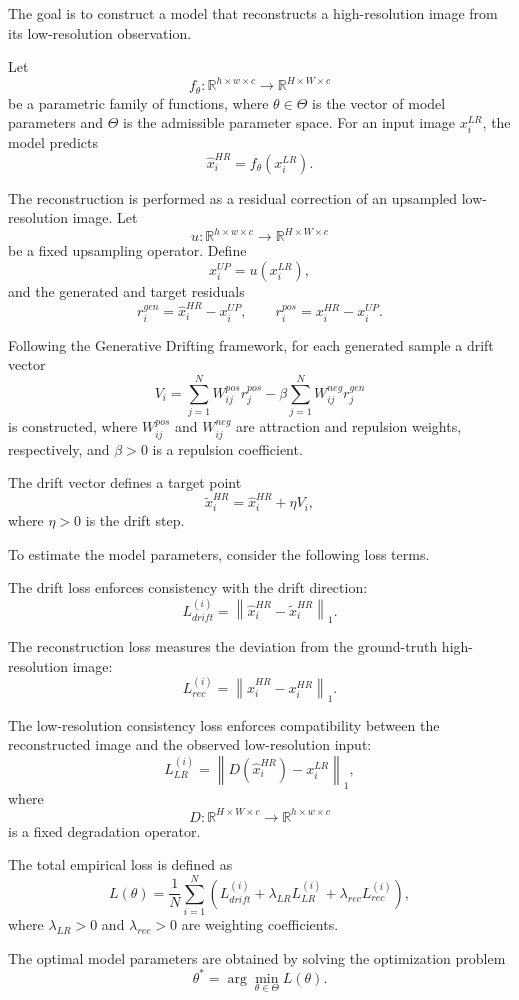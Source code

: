 \documentclass{article}
\begin{document}
The goal is to construct a model that reconstructs a high-resolution image
from its low-resolution observation.

Let
\[
f_{\theta}:\mathbb{R}^{h\times w\times c}\rightarrow\mathbb{R}^{H\times W\times c}
\]
be a parametric family of functions, where $\theta\in\Theta$ is the vector of
model parameters and $\Theta$ is the admissible parameter space.
For an input image $x_i^{LR}$, the model predicts
\[
\hat{x}_i^{HR}=f_{\theta}(x_i^{LR}).
\]

The reconstruction is performed as a residual correction of an upsampled
low-resolution image. Let
\[
u:\mathbb{R}^{h\times w\times c}\rightarrow\mathbb{R}^{H\times W\times c}
\]
be a fixed upsampling operator. Define
\[
x_i^{UP}=u(x_i^{LR}),
\]
and the generated and target residuals
\[
r_i^{gen}=\hat{x}_i^{HR}-x_i^{UP}, \qquad
r_i^{pos}=x_i^{HR}-x_i^{UP}.
\]

Following the Generative Drifting framework, for each generated sample
a drift vector
\[
V_i=
\sum_{j=1}^{N}W_{ij}^{pos}r_j^{pos}
-
\beta\sum_{j=1}^{N}W_{ij}^{neg}r_j^{gen}
\]
is constructed, where $W_{ij}^{pos}$ and $W_{ij}^{neg}$ are attraction and
repulsion weights, respectively, and $\beta>0$ is a repulsion coefficient.

The drift vector defines a target point
\[
\tilde{x}_i^{HR}=\hat{x}_i^{HR}+\eta V_i,
\]
where $\eta>0$ is the drift step.

To estimate the model parameters, consider the following loss terms.

The drift loss enforces consistency with the drift direction:
\[
L_{drift}^{(i)}=
\left\|
\hat{x}_i^{HR}-\tilde{x}_i^{HR}
\right\|_1.
\]

The reconstruction loss measures the deviation from the ground-truth
high-resolution image:
\[
L_{rec}^{(i)}=
\left\|
\hat{x}_i^{HR}-x_i^{HR}
\right\|_1.
\]

The low-resolution consistency loss enforces compatibility between the
reconstructed image and the observed low-resolution input:
\[
L_{LR}^{(i)}=
\left\|
D(\hat{x}_i^{HR})-x_i^{LR}
\right\|_1,
\]
where
\[
D:\mathbb{R}^{H\times W\times c}\rightarrow\mathbb{R}^{h\times w\times c}
\]
is a fixed degradation operator.

The total empirical loss is defined as
\[
L(\theta)=
\frac{1}{N}\sum_{i=1}^{N}
\left(
L_{drift}^{(i)}
+\lambda_{LR}L_{LR}^{(i)}
+\lambda_{rec}L_{rec}^{(i)}
\right),
\]
where $\lambda_{LR}>0$ and $\lambda_{rec}>0$ are weighting coefficients.

The optimal model parameters are obtained by solving the optimization problem
\[
\theta^{*}=
\arg\min_{\theta\in\Theta} L(\theta).
\]
\end{document}
